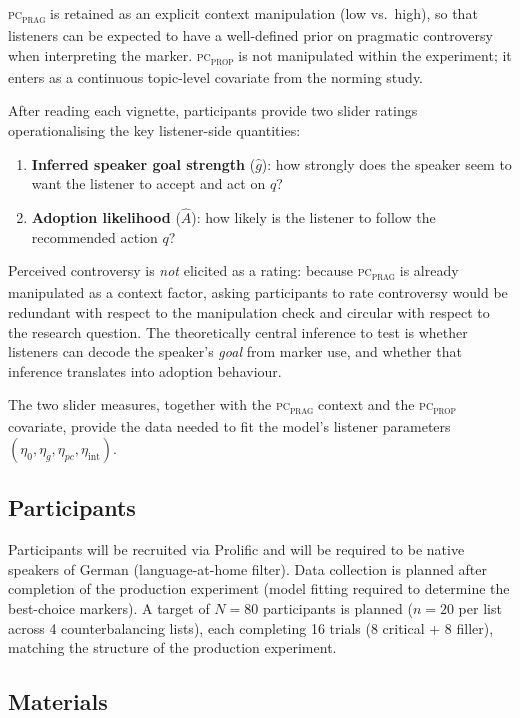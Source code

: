 \documentclass[12pt]{article}
\begin{document}
\textsc{pc\textsubscript{prag}} is retained as an explicit context
manipulation (low vs.\ high), so that listeners can be expected to
have a well-defined prior on pragmatic controversy when interpreting
the marker. \textsc{pc\textsubscript{prop}} is not manipulated within
the experiment; it enters as a continuous topic-level covariate from
the norming study.

After reading each vignette, participants provide two slider ratings
operationalising the key listener-side quantities:
\begin{enumerate}
  \item \textbf{Inferred speaker goal strength} ($\widehat{g}$):
        how strongly does the speaker seem to want the listener to
        accept and act on $q$?
  \item \textbf{Adoption likelihood} ($\widehat{A}$):
        how likely is the listener to follow the recommended action $q$?
\end{enumerate}

\noindent Perceived controversy is \emph{not} elicited as a rating:
because \textsc{pc\textsubscript{prag}} is already manipulated as a
context factor, asking participants to rate controversy would be
redundant with respect to the manipulation check and circular with
respect to the research question. The theoretically central inference
to test is whether listeners can decode the speaker's \emph{goal} from
marker use, and whether that inference translates into adoption
behaviour.

The two slider measures, together with the \textsc{pc\textsubscript{prag}}
context and the \textsc{pc\textsubscript{prop}} covariate, provide the
data needed to fit the model's listener parameters
$(\eta_0, \eta_g, \eta_{pc}, \eta_{\mathrm{int}})$.

\subsection{Participants}

Participants will be recruited via Prolific and will be required to be
native speakers of German (language-at-home filter).
Data collection is planned after completion of the production experiment
(model fitting required to determine the best-choice markers).
A target of $N = 80$ participants is planned ($n = 20$ per list across
4 counterbalancing lists), each completing 16 trials (8 critical + 8
filler), matching the structure of the production experiment.

\subsection{Materials}
\end{document}
